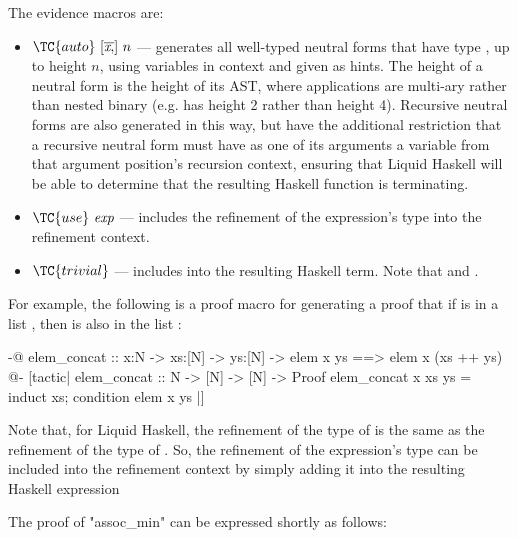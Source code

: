 \begin{itemize}
  The evidence macros are:
  \begin{itemize}
    \item
    $\TC{auto} ~ [\overline{\textit{x} ,}] ~ n$ --- generates all well-typed neutral forms that have type , up to height $n$, using variables in context and given as hints. 
    The height of a neutral form is the height of its AST, where applications are multi-ary rather than nested binary (e.g.  has height 2 rather than height 4).
    Recursive neutral forms are also generated in this way, but have the additional restriction that a recursive neutral form must have as one of its arguments a variable from that argument position's recursion context, ensuring that Liquid Haskell will be able to determine that the resulting Haskell function is terminating.
    \item $\TC{use} ~ \textit{exp}$ --- includes the refinement of the expression's type into the refinement context.
    \item $\TC{trivial}$ --- includes  into the resulting Haskell term. Note that  and .
  \end{itemize}
\end{itemize}

For example, the following is a proof macro for generating a proof that
if  is in a list , then  is also in the list :
\begin{code}
  {-@ 
  elem_concat ::
    x:N -> xs:[N] -> ys:[N] ->
    {elem x ys ==> elem x (xs ++ ys)}
  @-}
  [tactic|
  elem_concat :: N -> [N] -> [N] -> Proof
  elem_concat x xs ys =
    induct xs;
    condition {elem x ys}
  |]
\end{code}


Note that, for Liquid Haskell, the refinement of the type of  is the same as the refinement of the type of .
So, the refinement of the expression's type can be included into the refinement context by simply adding it into the resulting Haskell expression

 The proof of "assoc\_min" can be expressed shortly as follows:
  
